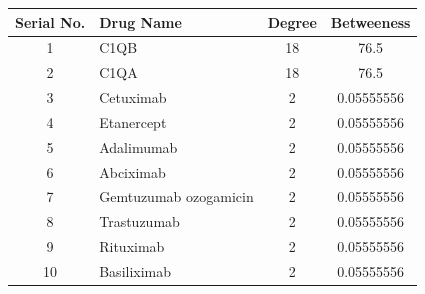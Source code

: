 \begin{table}[H]
    \centering
    \small
    \renewcommand{\arraystretch}{1.2} %
    \begin{tabular}{|c|p{3cm}|c|c|}
        \hline
        Serial No. & Drug Name & Degree & Betweeness \\
        \hline
        1 & C1QB & 18 & 76.5 \\
        \hline
        2 & C1QA & 18 & 76.5 \\
        \hline
        3 & Cetuximab & 2 & 0.05555556 \\
        \hline
        4 & Etanercept & 2 & 0.05555556 \\
        \hline
        5 & Adalimumab & 2 & 0.05555556 \\
        \hline
        6 & Abciximab & 2 & 0.05555556 \\
        \hline
        7 & Gemtuzumab ozogamicin & 2 & 0.05555556 \\
        \hline
        8 & Trastuzumab & 2 & 0.05555556 \\
        \hline
        9 & Rituximab & 2 & 0.05555556 \\
        \hline
        10 & Basiliximab & 2 & 0.05555556 \\
        \hline
    \end{tabular}
    
    \label{tab:drug_interactions_pdi}
\end{table}

